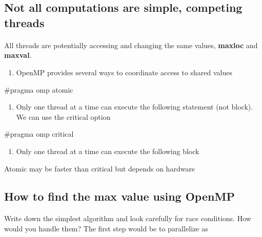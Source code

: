 \documentclass[%
oneside,                 %
final,                   %
10pt]{article}
\begin{document}
{{{{\ecppcod



\subsection{Not all computations are simple, competing threads}

\paragraph{}
All threads are potentially accessing and changing the same values, \textbf{maxloc} and \textbf{maxval}.
\begin{enumerate}
\item OpenMP provides several ways to coordinate access to shared values
\end{enumerate}

\noindent


\bcppcod
#pragma omp atomic

\ecppcod

\begin{enumerate}
\item Only one thread at a time can execute the following statement (not block). We can use the critical option
\end{enumerate}

\noindent


\bcppcod
#pragma omp critical

\ecppcod

\begin{enumerate}
\item Only one thread at a time can execute the following block
\end{enumerate}

\noindent
Atomic may be faster than critical but depends on hardware



\subsection{How to find the max value using OpenMP}

\paragraph{}
Write down the simplest algorithm and look carefully for race conditions. How would you handle them? 
The first step would be to parallelize as 








}}}}
\end{document}

